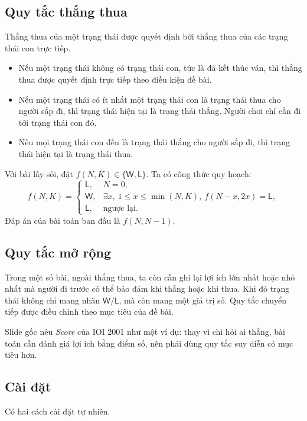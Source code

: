 \documentclass[11pt]{article}
\newcommand{\Win}{\mathsf{W}}
\newcommand{\Lose}{\mathsf{L}}
\begin{document}
\subsection{Quy tắc thắng thua}

Thắng thua của một trạng thái được quyết định bởi thắng thua của các trạng
thái con trực tiếp.

\begin{itemize}
  \item Nếu một trạng thái không có trạng thái con, tức là đã kết thúc ván,
  thì thắng thua được quyết định trực tiếp theo điều kiện đề bài.
  \item Nếu một trạng thái có ít nhất một trạng thái con là trạng thái thua
  cho người sắp đi, thì trạng thái hiện tại là trạng thái thắng. Người chơi
  chỉ cần đi tới trạng thái con đó.
  \item Nếu mọi trạng thái con đều là trạng thái thắng cho người sắp đi, thì
  trạng thái hiện tại là trạng thái thua.
\end{itemize}

Với bài lấy sỏi, đặt \(f(N,K)\in\{\Win,\Lose\}\). Ta có công thức quy hoạch:
\[
f(N,K)=
\begin{cases}
\Lose, & N=0,\\
\Win, & \exists x,\ 1\le x\le \min(N,K),\
        f(N-x,2x)=\Lose,\\
\Lose, & \text{ngược lại.}
\end{cases}
\]
Đáp án của bài toán ban đầu là \(f(N,N-1)\).

\subsection{Quy tắc mở rộng}

Trong một số bài, ngoài thắng thua, ta còn cần ghi lại lợi ích lớn nhất hoặc
nhỏ nhất mà người đi trước có thể bảo đảm khi thắng hoặc khi thua. Khi đó
trạng thái không chỉ mang nhãn \(\Win/\Lose\), mà còn mang một giá trị số.
Quy tắc chuyển tiếp được điều chỉnh theo mục tiêu của đề bài.

Slide gốc nêu \textit{Score} của IOI 2001 như một ví dụ: thay vì chỉ hỏi ai
thắng, bài toán cần đánh giá lợi ích bằng điểm số, nên phải dùng quy tắc suy
diễn có mục tiêu hơn.

\subsection{Cài đặt}

Có hai cách cài đặt tự nhiên.
\end{document}
